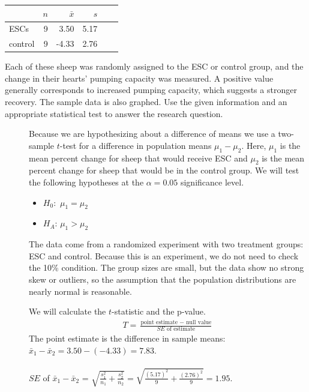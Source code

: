 \begin{examplewrap}
\begin{nexample}
{\begin{center}
\begin{tabular}{l rrrrr}
\hline
\hspace{10mm}	& $n$	& $\bar{x}$	& $s$  	 \\
\hline
ESCs		& 9		& 3.50		& 5.17  	\\
control		& 9		& -4.33		& 2.76  	 \\
\hline
\end{tabular}
\end{center}
Each of these sheep was randomly assigned to the ESC or control group, and the change in their hearts' pumping capacity was measured. A positive value generally corresponds to increased pumping capacity, which suggests a stronger recovery. The sample data is also graphed.  Use the given information and an appropriate statistical test to answer the research question.
}
\begin{description}
\item[]  Because we are hypothesizing about a difference of means we use a two-sample $t$-test for a difference in population means $\mu_1 - \mu_2$.  Here,  $\mu_1$ is the mean percent change for sheep that would receive ESC and $\mu_2$ is the mean percent change for sheep that would be in the control group.  We will test the following hypotheses at the $\alpha=0.05$ significance level.\vspace{-1mm}
\begin{itemize}
\setlength{\itemsep}{0mm}
\item[]  $H_0$:\, $\mu_{1} = \mu_{2} $  
\item[] $H_A$: $\mu_{1} > \mu_{2} $ 
\end{itemize}
\item[]  The data come from a randomized experiment with two treatment groups: ESC and control.  Because this is an experiment, we do not need to check the 10\% condition.  The group sizes are small, but the data show no strong skew or outliers, so the assumption that the population distributions are nearly normal is reasonable.
\item[  ]  We will calculate the $t$-statistic and the p-value.
\begin{align*}
T = \frac{\text{point estimate } - \text{ null value}}{SE \text{ of estimate}}
\end{align*}
The point estimate is the difference in sample means: $\bar{x}_{1} - \bar{x}_{2}=3.50 - (-4.33) = 7.83$.\\
\\
$SE$ of $\bar{x}_1-\bar{x}_2$ = $\sqrt{\frac{s_1^2}{n_1} + \frac{s_2^2}{n_2}}= \sqrt{\frac{(5.17)^2}{9} + \frac{(2.76)^2}{9}} = 1.95$.\\

\end{description}
\end{nexample}
\end{examplewrap}
